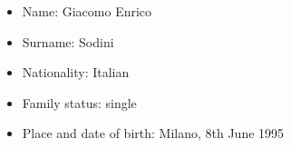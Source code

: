 \begin{itemize}[noitemsep]
\item Name: Giacomo Enrico
\item Surname: Sodini
\item Nationality: Italian
\item Family status: single
\item Place and date of birth: Milano, 8th June 1995
\end{itemize}
\medskip